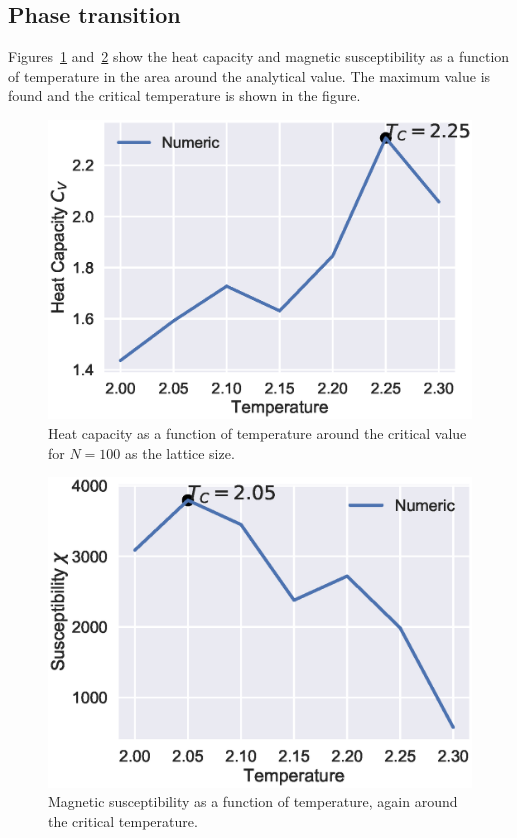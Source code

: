 \documentclass[aps,reprint]{revtex4-1}
\begin{document}
\subsection{Phase transition}
Figures~\ref{fig:L100Cv} and~\ref{fig:L100sus} show the heat capacity and
magnetic susceptibility as a function of temperature in the area around the analytical
value. The maximum value is found and the critical temperature is shown in the figure.
\begin{figure}
  \includegraphics[width=\columnwidth]{figures/L100Cv.eps}
  \caption{Heat capacity as a function of temperature around the critical value
  for $N = 100$ as the lattice size.}
  \label{fig:L100Cv}
\end{figure}
\begin{figure}
  \includegraphics[width=\columnwidth]{figures/L100sus.eps}
  \caption{Magnetic susceptibility as a function of temperature, again around the
  critical temperature.}
  \label{fig:L100sus}
\end{figure}
\end{document}
